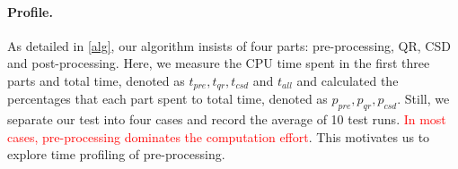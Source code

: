     \newpage
    
    \paragraph{Profile.}
    As detailed in \ref{alg}, our algorithm insists of four parts: pre-processing, QR, CSD and post-processing. Here, we measure the CPU time spent in the first three parts and total time, denoted as $t_{pre}, t_{qr}, t_{csd}$ and   $t_{all}$ and calculated the percentages that each part spent to total time, denoted as $p_{pre}, p_{qr}, p_{csd}$. Still, we separate our test into four cases and record the average of 10 test runs. \textcolor{red}{In most cases, pre-processing dominates the computation effort}. This motivates us to explore time profiling of pre-processing. 
    
